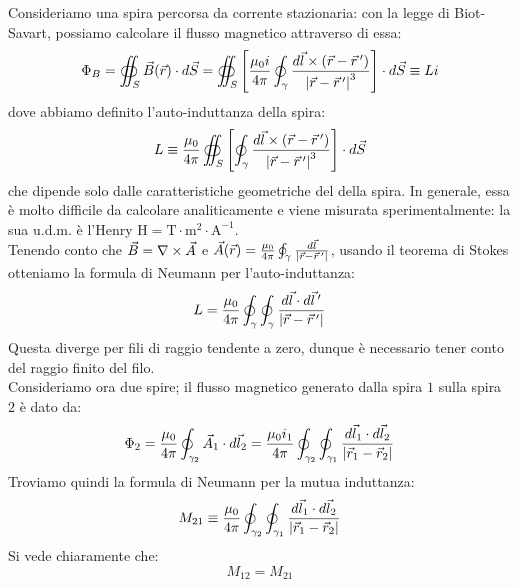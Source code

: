 \documentclass[]{article}
\begin{document}
Consideriamo una spira percorsa da corrente stazionaria: con la legge di Biot-Savart, possiamo calcolare il flusso magnetico attraverso di essa:
\begin{equation}
	\Phi_B = \oiint_S \vec{B}(\vec{r}) \cdot d\vec{S} = \oiint_S \left[ \frac{\mu_0 i}{4\pi} \oint_{\gamma} \frac{d\vec{l} \times (\vec{r} - \vec{r}\,')}{\left\lvert\vec{r}-\vec{r}\,'\right\rvert^3} \right]\cdot d\vec{S} \equiv Li
	\label{eq:17}
\end{equation}
dove abbiamo definito l'auto-induttanza della spira:
\begin{equation}
	L \equiv \frac{\mu_0}{4\pi} \oiint_S \left[ \oint_{\gamma} \frac{d\vec{l} \times (\vec{r} - \vec{r}\,')}{\left\lvert\vec{r}-\vec{r}\,'\right\rvert^3} \right] \cdot d\vec{S}
	\label{eq:18}
\end{equation}
che dipende solo dalle caratteristiche geometriche del della spira. In generale, essa è molto difficile da calcolare analiticamente e viene misurata sperimentalmente: la sua u.d.m. è l'Henry $ \text{H} = \text{T}\cdot\text{m}^2\cdot\text{A}^{-1} $. \\ 
%
Tenendo conto che $ \vec{B} = \nabla\times\vec{A} $ e $ \vec{A}(\vec{r}) = \frac{\mu_0}{4\pi} \oint_{\gamma} \frac{d\vec{l}}{\left\lvert\vec{r} - \vec{r}\,'\right\rvert} $, usando il teorema di Stokes otteniamo la formula di Neumann per l'auto-induttanza:
\begin{equation}
	L = \frac{\mu_0}{4\pi} \oint_{\gamma} \oint_{\gamma} \frac{d\vec{l}\cdot d\vec{l}\,'}{\left\lvert\vec{r} - \vec{r}\,'\right\rvert}
	\label{eq:19}
\end{equation}
Questa diverge per fili di raggio tendente a zero, dunque è necessario tener conto del raggio finito del filo. \\ 
%
Consideriamo ora due spire; il flusso magnetico generato dalla spira $ 1 $ sulla spira $ 2 $ è dato da:
\begin{equation}
	\Phi_2 = \frac{\mu_0}{4\pi} \oint_{\gamma_2} \vec{A}_1 \cdot d\vec{l}_2 = \frac{\mu_0 i_1}{4\pi} \oint_{\gamma_2} \oint_{\gamma_1} \frac{d\vec{l}_1 \cdot d\vec{l}_2}{\left\lvert\vec{r}_1 - \vec{r}_2\right\rvert}
	\label{eq:20}
\end{equation}
Troviamo quindi la formula di Neumann per la mutua induttanza:
\begin{equation}
	M_{21} \equiv \frac{\mu_0 }{4\pi} \oint_{\gamma_2} \oint_{\gamma_1} \frac{d\vec{l}_1 \cdot d\vec{l}_2}{\left\lvert\vec{r}_1 - \vec{r}_2\right\rvert}
	\label{eq:21}
\end{equation}
Si vede chiaramente che:
\begin{equation}
	M_{12} = M_{21}
	\label{eq:22}
\end{equation}
\end{document}
